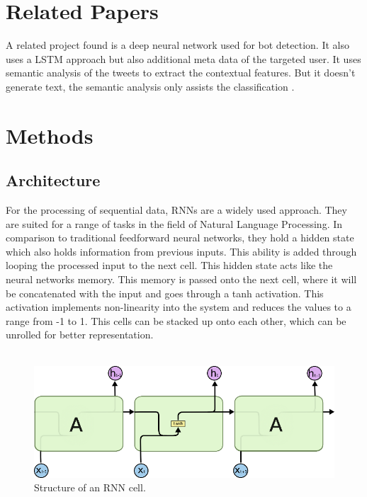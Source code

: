 \documentclass[conference]{IEEEtran}
\begin{document}
\section{Related Papers}

A related project found is a deep neural network used for bot detection. It also uses a LSTM approach but also additional meta data of the targeted user. It uses semantic analysis of the tweets to extract the contextual features. But it doesn’t generate text, the semantic analysis only assists the classification \cite{tim2}.

\section{Methods}

\subsection{Architecture}

For the processing of sequential data, RNNs are a widely used approach. They are suited for a range of tasks in the field of Natural Language Processing. In comparison to traditional feedforward neural networks, they hold a hidden state which also holds information from previous inputs. This ability is added through looping the processed input to the next cell. This hidden state acts like the neural networks memory. This memory is passed onto the next cell, where it will be concatenated with the input and goes through a tanh activation. This activation implements non-linearity into the system and reduces the values to a range from -1 to 1. This cells can be stacked up onto each other, which can be unrolled for better representation.\\
\\

\begin{figure}[htbp]
\centerline{\includegraphics{pictures/structure_rnn.png}}
\caption{Structure of an RNN cell.}
\label{fig:structure_rnn}
\end{figure}
\end{document}

